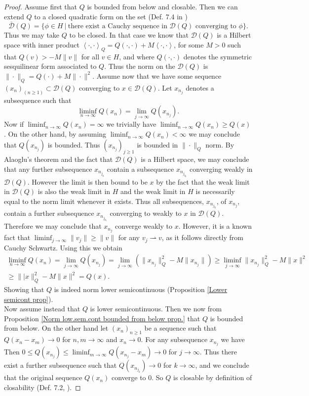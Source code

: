 \documentclass[a4paper,11pt]{article}
\newcommand{\dom}[1]{\mathscr D\left(#1\right)}
\renewcommand{\braket}[1]{\left\langle#1\right\rangle}
\numberwithin{equation}{section}
\begin{document}
\begin{proof}
	Assume first that $ Q $ is bounded from below and closable. Then we can extend $ Q $ to a closed quadratic form on the set (Def. 7.4 in \cite{JPS_lecturenotes})
	$$ \bar{\mathscr{D}}(Q)=\{\phi\in H\ |\ \text{there exist a Cauchy sequence in }\dom{Q}\text{ converging to }\phi \}. $$
	Thus we may take $ Q $ to be closed. In that case we know that $ \dom{Q} $ is a Hilbert space with inner product $ \braket{\cdot,\cdot}_Q=Q(\cdot,\cdot)+M\braket{\cdot,\cdot} $, for some $ M>0 $ such that $ Q(v)>-M\|v\| $ for all $ v\in H $, and where $ Q(\cdot,\cdot) $ denotes the symmetric sesquilinear form associated to $ Q $. Thus the norm on the $ \dom{Q} $ is $\|\cdot\|_Q= Q(\cdot)+M\|\cdot\|^2 $. Assume now that we have some sequence $ (x_n)_{(n\geq1)}\subset\dom{Q} $ converging to $ x\in\dom{Q} $. Let $ x_{n_j} $ denotes a subsequence such that $$ \liminf_{n\to\infty}Q(x_n)=\lim\limits_{j\to\infty}Q(x_{n_j}). $$
	Now if $ \liminf_{n\to\infty} Q(x_n)=\infty $ we trivially have $ \liminf_{n\to\infty} Q(x_n)\geq Q(x) $. On the other hand, by assuming $ \liminf_{n\to\infty} Q(x_n)<\infty $ we may conclude that $ Q(x_{n_j}) $ is bounded. Thus $ (x_{n_j})_{j\geq1} $ is bounded in $ \|\cdot\|_Q $ norm. By Alaoglu's theorem and the fact that $ \dom{Q} $ is a Hilbert space, we may conclude that any further subsequence $ x_{n_{j_k}} $ contain a subsequence $ x_{n_{j_{k_l}}} $ converging weakly in $ \dom{Q} $. However the limit is then bound to be $ x $ by the fact that the weak limit in $ \dom{Q} $ is also the weak limit in $ H $ and the weak limit in $ H $ is necessarily equal to the norm limit whenever it exists. Thus all subsequences, $ x_{n_{j_k}} $, of $ x_{n_j} $, contain a further subsequence $ x_{n_{j_{k_l}}} $ converging to weakly to $ x $ in $ \dom{Q} $. Therefore we may conclude that $x_{n_j}$ converge weakly to $ x $. However, it is a known fact that $ \liminf_{j\to\infty}\|v_j\|\geq\|v\| $ for any $ v_j\rightharpoonup v $, as it follows directly from Cauchy Schwartz. Using this we obtain \begin{equation}
	\begin{aligned}
	\liminf_{n\to\infty}Q(x_n)=\lim\limits_{j\to\infty}Q(x_{n_j})=\lim_{j\to\infty}\left(\|x_{n_j}\|_Q^2-M\|x_{n_j}\|\right)\geq\liminf_{j\to\infty}\|x_{n_j}\|_Q^2-M\|x\|^2\\\geq\||x\|_Q^2-M\|x\|^2=Q(x).
	\end{aligned}
	\end{equation}
	Showing that $ Q $ is indeed norm lower semicontinuous (Proposition \ref{Lower semicont prop}).\\
	Now assume instead that $ Q $ is lower semicontinuous. Then we now from Proposition \ref{Norm low.sem.cont bounded from below prop.} that $ Q $ is bounded from below. On the other hand let $ (x_n)_{n\geq1} $ be a sequence such that $ Q(x_n-x_m)\to0 $ for $ n,m\to\infty $ and $ x_n\to0 $. For any subsequence $ x_{n_j} $ we have Then $ 0\leq Q(x_{n_j})\leq\liminf_{m\to\infty}Q(x_{n_j}-x_m)\to 0 $ for $ j\to\infty $. Thus there exist a further subsequence such that $ Q(x_{n_{j_k}})\to0 $ for $ k\to\infty $, and we conclude that the original sequence $ Q(x_n) $ converge to $ 0 $. So $ Q $ is closable by definition of closability (Def. 7.2, \cite{JPS_lecturenotes}).
\end{proof}
\end{document}
